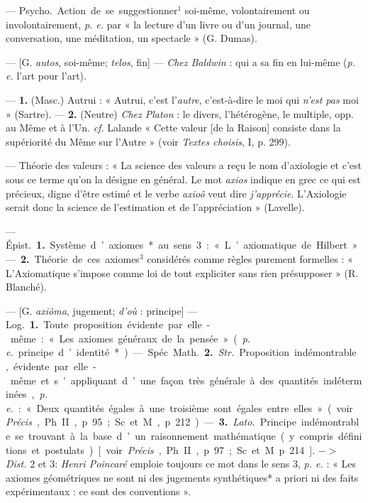 \begin{itemize}[leftmargin=1cm, label=, itemsep=1pt]
 — \si{Psycho.} Action
de se suggestionner$^1$ soi-même, volontairement ou involontairement,
{\it p. e.} par « la lecture d’un livre ou
d’un journal, une conversation, une
méditation, un spectacle » (G.
Dumas).

 — [G. {\it autos}, soi-même; {\it telos},
fin] — {\it Chez Baldwin} : qui a sa fin
en lui-même ({\it p. e.} l’art pour l’art).

 — {\bf 1.} (Masc.) Autrui :
« Autrui, c’est l’{\it autre}, c’est-à-dire
le moi qui {\it n’est pas} moi » (Sartre). —
{\bf 2.} (Neutre) {\it Chez Platon} : le divers,
l’hétérogène, le multiple, opp. au
Même et à l’Un. {\it cf.}  Lalande
« Cette valeur [de la Raison] consiste
dans la supériorité du Même sur
l'Autre » (voir {\it Textes choisis}, I,
p. 299).

 — Théorie des valeurs : « La
science des valeurs a reçu le nom
d’axiologie et c'est sous ce terme
qu’on la désigne en général. Le mot
{\it axios} indique en grec ce qui est précieux, digne d'être estimé et le
verbe {\it axioô} veut dire {\it j'apprécie}.
L’Axiologie serait donc la science
de l’estimation et de l’appréciation »
(Lavelle).

 — \si{Épist.} {\bf 1.} Système
d’axiomes* au sens 3 : « L’axiomatique de Hilbert ». — {\bf 2.} Théorie de
ces axiomes$^3$ considérés comme
règles purement formelles : « L’Axiomatique s'impose comme loi de tout
expliciter sans rien présupposer »
(R. Blanché).

 — [G. {\it axiôma}, jugement; {\it d'où} :
principe] — \si{Log.} {\bf 1.} Toute proposition évidente par elle-même : « Les
axiomes généraux de la pensée » ({\it p. e.}
principe d’identité*).

— Spéc. \si{Math.} {\bf 2.} {\it Str.} Proposition indémontrable, évidente par
elle-même et s'appliquant d’une
façon très générale à des quantités
indéterminées, {\it p. e.} : « Deux quantités
égales à une troisième sont égales
entre elles » (voir {\it Précis}, Ph. II,
p. 95; Sc. et M., p. 212). — {\bf 3.} {\it Lato.}
Principe indémontrable se trouvant
à la base d’un raisonnement mathématique (y compris définitions et
postulats) [voir {\it Précis}, Ph. II, p. 97;
Sc. et M. p. 214]. $->$ {\it Dist.} 2 et 3:
{\it Henri Poincaré} emploie toujours
ce mot dans le sens 3, {\it p. e.} : « Les
axiomes géométriques ne sont ni des
jugements synthétiques* a priori ni
des faits expérimentaux : ce sont
des conventions ».
	\end{itemize}
